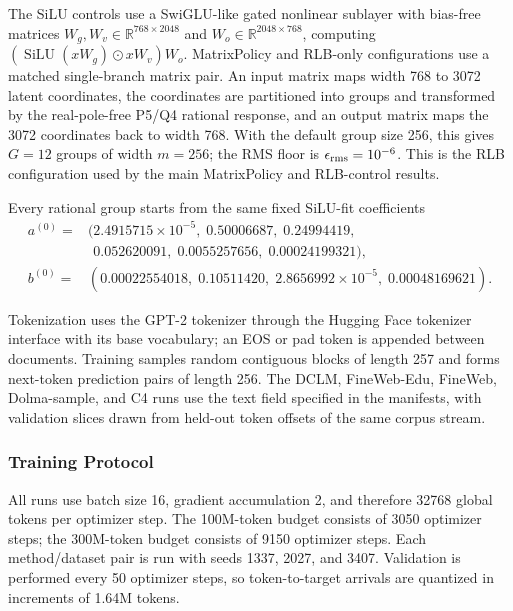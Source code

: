 \documentclass{article}
\begin{document}
The SiLU controls use a SwiGLU-like gated nonlinear sublayer with bias-free
matrices $W_g,W_v\in\mathbb{R}^{768\times 2048}$ and
$W_o\in\mathbb{R}^{2048\times 768}$, computing
$(\operatorname{SiLU}(xW_g)\odot xW_v)W_o$.  MatrixPolicy and RLB-only
configurations use a matched single-branch matrix pair.  An input matrix maps
width 768 to 3072 latent coordinates, the coordinates are partitioned into
groups and transformed by the real-pole-free P5/Q4 rational response, and an
output matrix maps the 3072 coordinates back to width 768.  With the default
group size 256, this gives $G=12$ groups of width $m=256$; the RMS floor is
$\epsilon_{\rm rms}=10^{-6}$.  This is the RLB configuration used by the main
MatrixPolicy and RLB-control results.

Every rational group starts from the same fixed SiLU-fit coefficients
\begin{equation}
\begin{aligned}
    a^{(0)}={}&(2.4915715{\times}10^{-5},\;0.50006687,\;0.24994419,\\[-2pt]
    &\phantom{(}0.052620091,\;0.0055257656,\;0.00024199321),\\
    b^{(0)}={}&(0.00022554018,\;0.10511420,\;
    2.8656992{\times}10^{-5},\;0.00048169621).
\end{aligned}
\label{eq:rlb-silu-initialization}
\end{equation}

Tokenization uses the GPT-2 tokenizer through the Hugging Face tokenizer
interface with its base vocabulary; an EOS or pad token is appended between
documents.  Training samples random contiguous blocks of
length 257 and forms next-token prediction pairs of length 256.  The DCLM,
FineWeb-Edu, FineWeb, Dolma-sample, and C4 runs use the text field specified in
the manifests, with validation slices drawn from held-out token offsets of the
same corpus stream.

\subsubsection{Training Protocol}
\label{app:training-protocol}

All runs use batch size 16, gradient accumulation 2, and therefore 32768 global
tokens per optimizer step.  The 100M-token budget consists of 3050 optimizer
steps; the 300M-token budget consists of 9150 optimizer steps.  Each
method/dataset pair is run with seeds 1337, 2027, and 3407.  Validation is
performed every 50 optimizer steps, so token-to-target arrivals are quantized in
increments of 1.64M tokens.
\end{document}
